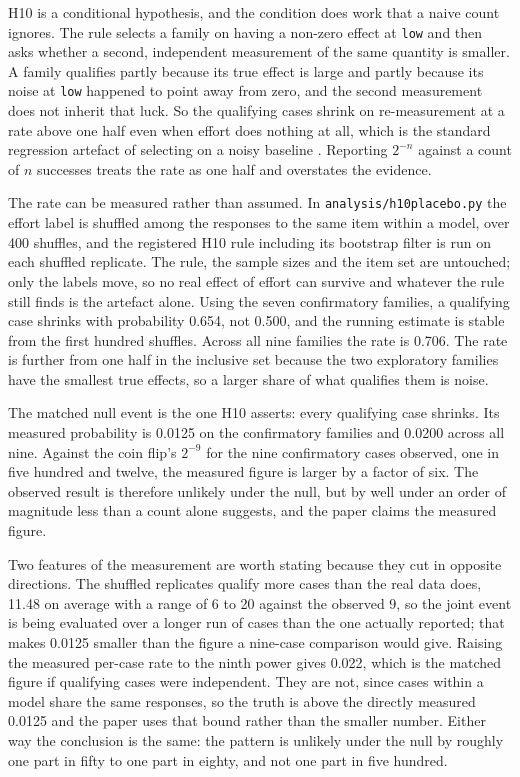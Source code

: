 \label{sec:h10null}\label{app:h10null}
H10 is a conditional hypothesis, and the condition does work that a naive
count ignores. The rule selects a family on having a non-zero effect at
\texttt{low} and then asks whether a second, independent measurement of the
same quantity is smaller. A family qualifies partly because its true effect
is large and partly because its noise at \texttt{low} happened to point away
from zero, and the second measurement does not inherit that luck. So the
qualifying cases shrink on re-measurement at a rate above one half even when
effort does nothing at all, which is the standard regression artefact of
selecting on a noisy baseline \citep{barnett2005regression}. Reporting
$2^{-n}$ against a count of $n$ successes treats the rate as one half and
overstates the evidence.

The rate can be measured rather than assumed. In
\texttt{analysis/h10\us placebo.py} the effort label is shuffled among the
responses to the same item within a model, over 400 shuffles, and the
registered H10 rule including its bootstrap filter is run on each shuffled
replicate. The rule, the sample sizes and the item set are untouched; only
the labels move, so no real effect of effort can survive and whatever the
rule still finds is the artefact alone. Using the seven confirmatory
families, a qualifying case shrinks with probability 0.654, not 0.500, and
the running estimate is stable from the first hundred shuffles. Across all
nine families the rate is 0.706. The rate is further from one half in the
inclusive set because the two exploratory families have the smallest true
effects, so a larger share of what qualifies them is noise.

The matched null event is the one H10 asserts: every qualifying case shrinks.
Its measured probability is 0.0125 on the confirmatory families and 0.0200
across all nine. Against the coin flip's $2^{-9}$ for the nine confirmatory
cases observed, one in five hundred and twelve, the measured figure is larger
by a factor of six. The observed result is therefore unlikely under the null,
but by well under an order of magnitude less than a count alone suggests, and
the paper claims the measured figure.

Two features of the measurement are worth stating because they cut in
opposite directions. The shuffled replicates qualify more cases than the real
data does, 11.48 on average with a range of 6 to 20 against the observed 9,
so the joint event is being evaluated over a longer run of cases than the one
actually reported; that makes 0.0125 smaller than the figure a nine-case
comparison would give. Raising the measured per-case rate to the ninth power
gives 0.022, which is the matched figure if qualifying cases were
independent. They are not, since cases within a model share the same
responses, so the truth is above the directly measured 0.0125 and the paper
uses that bound rather than the smaller number. Either way the conclusion is
the same: the pattern is unlikely under the null by roughly one part in fifty
to one part in eighty, and not one part in five hundred.
